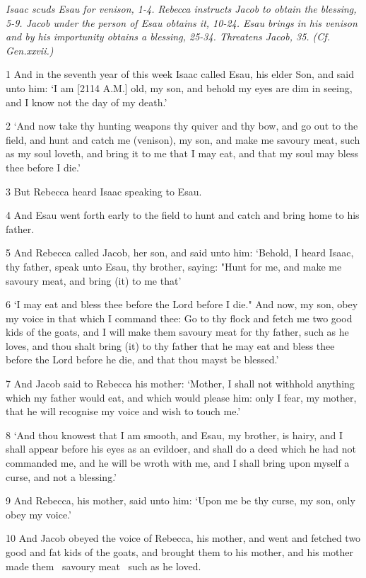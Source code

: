 \textit{Isaac scuds Esau for venison, 1-4. Rebecca instructs Jacob to obtain the blessing, 5-9. Jacob under the person of Esau obtains it, 10-24. Esau brings in his venison and by his importunity obtains a blessing, 25-34. Threatens Jacob, 35. (Cf. Gen.xxvii.)}

\par 1 And in the seventh year of this week Isaac called Esau, his elder Son, and said unto him: ‘I am [2114 A.M.] old, my son, and behold my eyes are dim in seeing, and I know not the day of my death.’
\par 2 ‘And now take thy hunting weapons thy quiver and thy bow, and go out to the field, and hunt and catch me (venison), my son, and make me savoury meat, such as my soul loveth, and bring it to me that I may eat, and that my soul may bless thee before I die.’
\par 3 But Rebecca heard Isaac speaking to Esau.
\par 4 And Esau went forth early to the field to hunt and catch and bring home to his father.
\par 5 And Rebecca called Jacob, her son, and said unto him: ‘Behold, I heard Isaac, thy father, speak unto Esau, thy brother, saying: "Hunt for me, and make me savoury meat, and bring (it) to me that’
\par 6 ‘I may eat and bless thee before the Lord before I die." And now, my son, obey my voice in that which I command thee: Go to thy flock and fetch me two good kids of the goats, and I will make them savoury meat for thy father, such as he loves, and thou shalt bring (it) to thy father that he may eat and bless thee before the Lord before he die, and that thou mayst be blessed.’
\par 7 And Jacob said to Rebecca his mother: ‘Mother, I shall not withhold anything which my father would eat, and which would please him: only I fear, my mother, that he will recognise my voice and wish to touch me.’
\par 8 ‘And thou knowest that I am smooth, and Esau, my brother, is hairy, and I shall appear before his eyes as an evildoer, and shall do a deed which he had not commanded me, and he will be wroth with me, and I shall bring upon myself a curse, and not a blessing.’
\par 9 And Rebecca, his mother, said unto him: ‘Upon me be thy curse, my son, only obey my voice.’
\par 10 And Jacob obeyed the voice of Rebecca, his mother, and went and fetched two good and fat kids of the goats, and brought them to his mother, and his mother made them ~savoury meat~ such as he loved.
